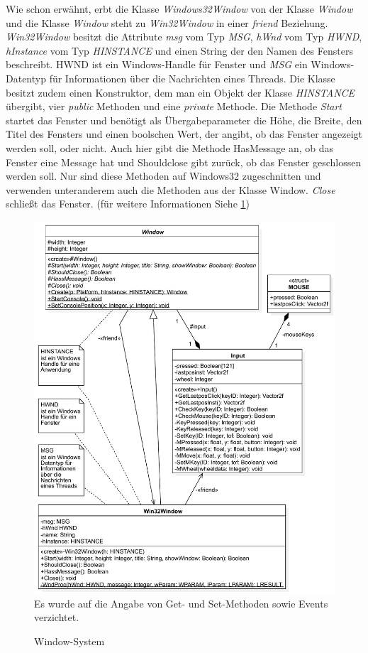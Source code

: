 Wie schon erwähnt, erbt die Klasse \textit{Windows32Window} von der Klasse \textit{Window} und die Klasse \textit{Window} steht zu \textit{Win32Window} in einer \textit{friend} Beziehung.
\textit{Win32Window} besitzt die Attribute \textit{msg} vom Typ \textit{MSG}, \textit{hWnd} vom Typ \textit{HWND}, \textit{hInstance} vom Typ \textit{HINSTANCE} und einen String der den Namen des Fensters beschreibt.
HWND ist ein Windows-Handle für Fenster und \textit{MSG} ein Windows-Datentyp für Informationen über die Nachrichten eines Threads. 
Die Klasse besitzt zudem einen Konstruktor, dem man ein Objekt der Klasse \textit{HINSTANCE} übergibt, vier \textit{public} Methoden und eine \textit{private} Methode. Die Methode \textit{Start} startet das Fenster und benötigt als Übergabeparameter die Höhe, die Breite, den Titel des Fensters und einen boolschen Wert, der angibt, ob das Fenster angezeigt werden soll, oder nicht.
Auch hier gibt die Methode HasMessage an, ob das Fenster eine Message hat und Shouldclose gibt zurück, ob das Fenster geschlossen werden soll. Nur sind diese Methoden auf Windows32 zugeschnitten und verwenden unteranderem auch die Methoden aus der Klasse Window.
\textit{Close} schließt das Fenster. (für weitere Informationen Siehe \cref{Windowsystem})

\begin{figure}
	\begin{center}
		\includegraphics[width=\textwidth]{03unserprogramm/Engine/WindowSystem.pdf}
		Es wurde auf die Angabe von Get- und Set-Methoden sowie Events verzichtet.
		\caption{Window-System}\label{Windowsystem}
	\end{center}
\end{figure}

